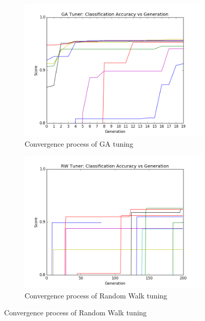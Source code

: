 \begin{figure}[H]
	\centering
	\begin{subfigure}[b]{0.45\linewidth}
	    \includegraphics[width=\linewidth]{sections/imgs/ga/summary.png}
	    \caption{Convergence process of GA tuning}
	    \label{fig:ga_tuning_summary}
	\end{subfigure}
	\begin{subfigure}[b]{0.45\linewidth}
		\includegraphics[width=\linewidth]{sections/imgs/random_walk/summary.png}
		\caption{Convergence process of Random Walk tuning}
		\label{fig:rw_tuning_summary}
	\end{subfigure}
	

\end{figure}
